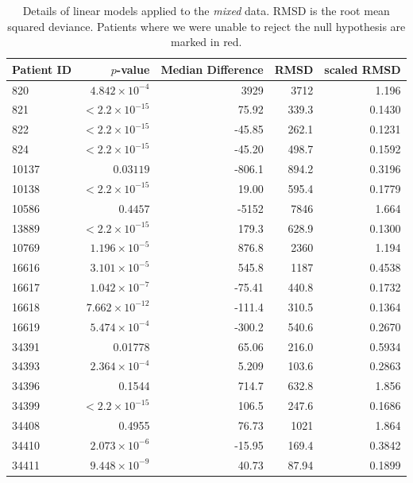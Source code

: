 \documentclass[12pt]{article}
\newcommand{\badpat}[1]{\rowcolor{red}#1}
\begin{document}
\begin{table}[!ht]
\def\arraystretch{1.3}%
\begin{center}
\begin{tabular}{lrrrr} 
Patient ID & $p$-value & Median Difference & RMSD & scaled RMSD \\ 
\hline
820 & $4.842 \times 10^{-4}$ & 3929 & 3712 & 1.196 \\
821 & $< 2.2 \times 10^{-15}$ &75.92 & 339.3 & 0.1430 \\
822 & $< 2.2 \times 10^{-15}$ & -45.85 & 262.1 & 0.1231 \\
824 & $< 2.2 \times 10^{-15}$ & -45.20 & 498.7 & 0.1592 \\
\badpat{10137 & $0.03119$ & -806.1 & 894.2 & 0.3196} \\
10138 & $< 2.2 \times 10^{-15}$ & 19.00 & 595.4 & 0.1779 \\
\badpat{10586 & $0.4457$ & -5152 & 7846 & 1.664} \\
13889 & $< 2.2 \times 10^{-15}$ & 179.3 & 628.9 & 0.1300 \\
10769 & $1.196 \times 10^{-5}$ & 876.8 & 2360 & 1.194 \\
16616 & $3.101 \times 10^{-5}$ & 545.8 & 1187 & 0.4538 \\
16617 & $1.042 \times 10^{-7}$ & -75.41 & 440.8 & 0.1732 \\
16618 & $7.662 \times 10^{-12}$ & -111.4 & 310.5 & 0.1364 \\
16619 & $5.474 \times 10^{-4}$ & -300.2 & 540.6 & 0.2670 \\
\badpat{34391 & 0.01778 & 65.06 & 216.0 & 0.5934} \\
34393 & $2.364 \times 10^{-4}$ & 5.209 & 103.6 & 0.2863 \\
\badpat{34396 & 0.1544 & 714.7 & 632.8 & 1.856} \\
34399 & $< 2.2 \times 10^{-15}$ & 106.5 & 247.6 & 0.1686 \\
\badpat{34408 & 0.4955 & 76.73 & 1021 & 1.864} \\
34410 & $2.073 \times 10^{-6}$ & -15.95 & 169.4 & 0.3842 \\
34411 & $9.448 \times 10^{-9}$ & 40.73 & 87.94 & 0.1899 \\
\hline
\end{tabular}
\end{center}
  \caption{Details of linear models applied to the \emph{mixed} data. RMSD is the root mean squared deviance. Patients where we were unable to reject the null hypothesis are marked in red.
   }\label{tab:patientserror} 
\end{table}
\end{document}
